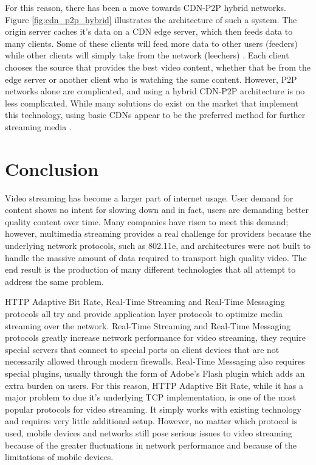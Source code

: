 \documentclass[12pt]{article}
\begin{document}
For this reason, there has been a move towards CDN-P2P hybrid networks.  Figure \ref{fig:cdn_p2p_hybrid} illustrates the architecture of such a system.  The origin server caches it's data on a CDN edge server, which then feeds data to many clients.  Some of these clients will feed more data to other users (feeders) while other clients will simply take from the network (leechers) \cite{6089062}.  Each client chooses the source that provides the best video content, whether that be from the edge server or another client who is watching the same content. However, P2P networks alone are complicated, and using a hybrid CDN-P2P architecture is no less complicated.  While many solutions do exist on the market that implement this technology, using basic CDNs appear to be the preferred method for further streaming media \cite{6089062}.

\section{Conclusion}
Video streaming has become a larger part of internet usage.  User demand for content shows no intent for slowing down and in fact, users are demanding better quality content over time.  Many companies have risen to meet this demand; however, multimedia streaming provides a real challenge for providers because the underlying network protocols, such as 802.11e, and architectures were not built to handle the massive amount of data required to transport high quality video.  The end result is the production of many different technologies that all attempt to address the same problem.

 HTTP Adaptive Bit Rate, Real-Time Streaming and Real-Time Messaging protocols all try and provide application layer protocols to optimize media streaming over the network.  Real-Time Streaming and Real-Time Messaging protocols greatly increase network performance for video streaming, they require special servers that connect to special ports on client devices that are not necessarily allowed through modern firewalls.  Real-Time Messaging also requires special plugins, usually through the form of Adobe's Flash plugin which adds an extra burden on users.  For this reason, HTTP Adaptive Bit Rate, while it has a major problem to due it's underlying TCP implementation, is one of the most popular protocols for video streaming.  It simply works with existing technology and requires very little additional setup.  However, no matter which protocol is used, mobile devices and networks still pose serious issues to video streaming because of the greater fluctuations in network performance and because of the limitations of mobile devices.
\end{document}
